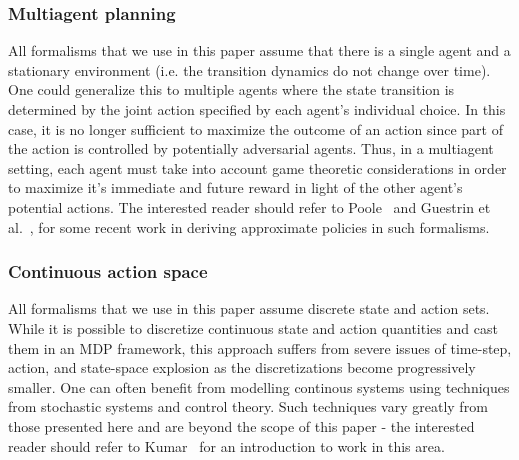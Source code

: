 {\subsubsection{Multiagent planning} All formalisms that we use in
this paper assume that there is a single agent and a stationary
environment (i.e. the transition dynamics do not change over time).
One could generalize this to multiple agents where the state
transition is determined by the joint action specified by each agent's
individual choice.  In this case, it is no longer sufficient to
maximize the outcome of an action since part of the action is
controlled by potentially adversarial agents.  Thus, in a multiagent
setting, each agent must take into account game theoretic
considerations in order to maximize it's immediate and future reward
in light of the other agent's potential actions.  The interested
reader should refer to Poole~\cite{ICL} and Guestrin et al.~\cite{guestrin:nips01}, for some
recent work in deriving approximate policies in such formalisms.

\subsubsection{Continuous action space} All formalisms
that we use in this paper assume discrete state and action sets.
While it is possible to discretize continuous state and action quantities and cast
them in an MDP framework, this approach suffers from severe issues of
time-step, action, and state-space explosion as the discretizations
become progressively smaller.  One can often benefit from modelling
continous systems using techniques from stochastic systems and control
theory.  Such techniques vary greatly from those presented here and
are beyond the scope of this paper - the interested reader should
refer to Kumar~\cite{control} for an introduction to work in this area.
}


\thispagestyle{empty}

\newpage


\newpage
{}




\appendix






